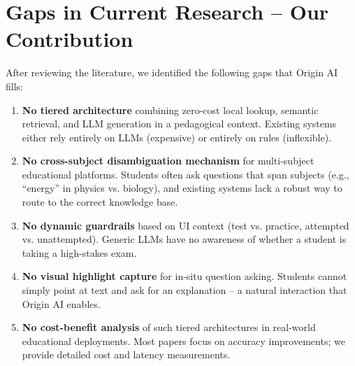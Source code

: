 \section{Gaps in Current Research – Our Contribution}


After reviewing the literature, we identified the following gaps that Origin AI fills:

\begin{enumerate}
    \item \textbf{No tiered architecture} combining zero-cost local lookup, semantic retrieval, and LLM generation in a pedagogical context. Existing systems either rely entirely on LLMs (expensive) or entirely on rules (inflexible).
    \item \textbf{No cross-subject disambiguation mechanism} for multi-subject educational platforms. Students often ask questions that span subjects (e.g., ``energy'' in physics vs. biology), and existing systems lack a robust way to route to the correct knowledge base.
    \item \textbf{No dynamic guardrails} based on UI context (test vs. practice, attempted vs. unattempted). Generic LLMs have no awareness of whether a student is taking a high-stakes exam.
    \item \textbf{No visual highlight capture} for in-situ question asking. Students cannot simply point at text and ask for an explanation – a natural interaction that Origin AI enables.
    \item \textbf{No cost-benefit analysis} of such tiered architectures in real-world educational deployments. Most papers focus on accuracy improvements; we provide detailed cost and latency measurements.
\end{enumerate}
